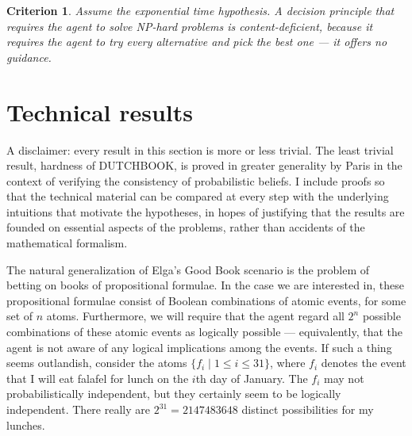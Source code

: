 \documentclass[letterpaper,12pt]{article}
\renewcommand{\phi}{\varphi}
\newtheorem{guidance}{Criterion}[section]
\begin{document}
\begin{guidance}
Assume the exponential time hypothesis. A decision principle that requires the agent to solve NP-hard problems is \emph{content-deficient}, because it requires the agent to try every alternative and pick the best one --- it offers no \emph{guidance}.
\end{guidance}

\section{Technical results}
A disclaimer: every result in this section is more or less trivial. The least trivial result, hardness of DUTCHBOOK, is proved in greater generality by Paris in the context of verifying the consistency of probabilistic beliefs. I include proofs so that the technical material can be compared at every step with the underlying intuitions that motivate the hypotheses, in hopes of justifying that the results are founded on essential aspects of the problems, rather than accidents of the mathematical formalism.

The natural generalization of Elga's Good Book scenario is the problem of betting on books of propositional formulae. In the case we are interested in, these propositional formulae consist of Boolean combinations of atomic events, for some set of $n$ atoms. Furthermore, we will require that the agent regard all $2^n$ possible combinations of these atomic events as logically possible --- equivalently, that the agent is not aware of any logical implications among the events. If such a thing seems outlandish, consider the atoms $\{f_i \mid 1 \leq i \leq 31\}$, where $f_i$ denotes the event that I will eat falafel for lunch on the $i$th day of January. The $f_i$ may not probabilistically independent, but they certainly seem to be logically independent. There really are $2^{31} = 2147483648$ distinct possibilities for my lunches.

\end{document}
